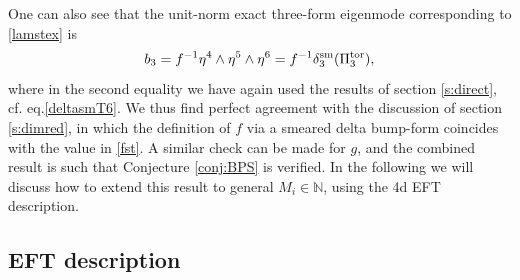 \documentclass[11pt]{article}
\def\be{\begin{equation}}
\def\ee{\end{equation}}
\begin{document}
One can also see that the unit-norm exact three-form eigenmode corresponding to \eqref{lamstex} is
\be
b_3 = f^{-1}  \eta^4 \wedge \eta^5 \wedge \eta^6  = f^{-1} \delta_3^{\rm sm} (\Pi_3^{\rm tor}),
\ee
where in the second equality we have again used the results of section \ref{s:direct}, cf. eq.\eqref{deltasmT6}. We thus find perfect agreement with the discussion of section \ref{s:dimred}, in which the definition of $f$ via a smeared delta bump-form coincides with the value in \eqref{fst}. A similar check can be made for $g$, and the combined result is such that Conjecture \ref{conj:BPS} is verified. In the following we will discuss how to extend this result to general $M_i \in \mathbb{N}$, using the 4d EFT description. 

\subsection{EFT description}
\label{ss:EFTdesc}
\end{document}
